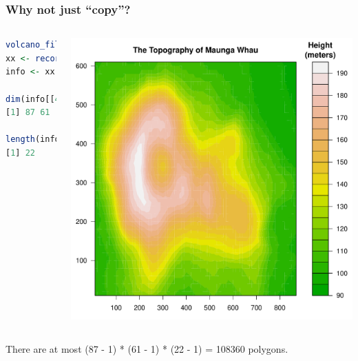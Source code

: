 \documentclass{beamer}
\begin{document}



\begin{frame}[fragile]
\frametitle{Why not just ``copy''?}

\begin{columns}[c]
\begin{lstlisting}[language = R]
volcano_filled.contour()
xx <- recordPlot()
info <- xx[[1]][[12]][[2]]

dim(info[[4]])
[1] 87 61

length(info[[5]])
[1] 22
 
\end{lstlisting}
\begin{center}
\includegraphics{plot/filled_example_1}
\end{center}

\end{columns}
There are at most (87 - 1) * (61 - 1) * (22 - 1) =  108360 polygons.


\end{frame}


\end{document}
